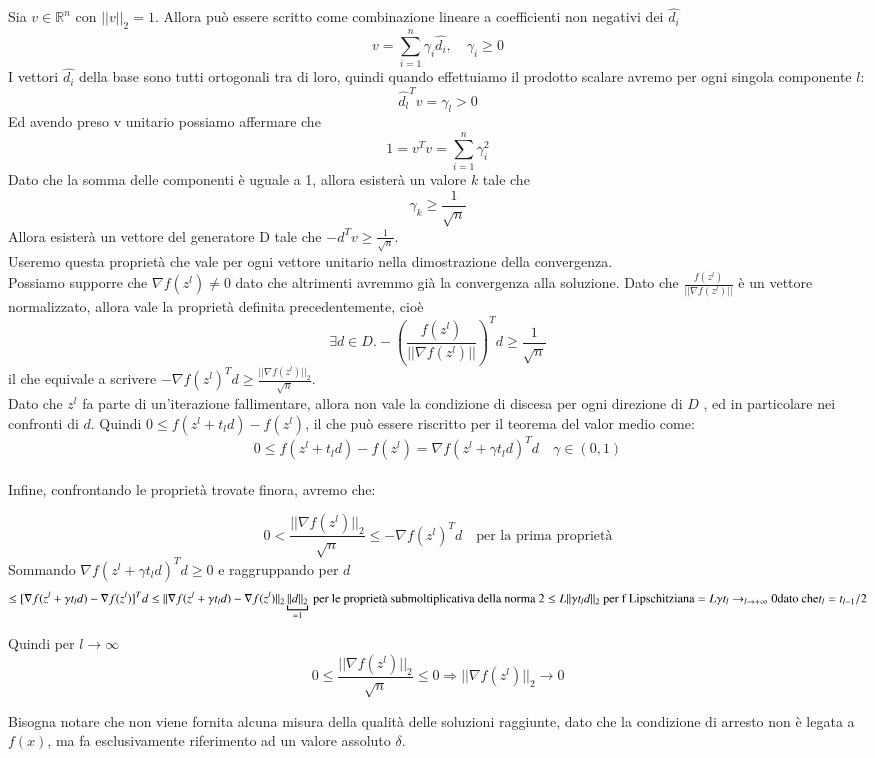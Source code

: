 \begin{thproof} Sia $v \in \mathbb{R}^{n}$ con $||v||_{2} = 1$.
Allora può essere scritto come combinazione lineare a coefficienti non
negativi dei $\hat{d_i}$
$$ v = \displaystyle \sum_{i=1}^{n} \gamma_i \hat{d_i}, 
\quad \gamma_i \geq 0 $$ I vettori $\hat{d_i}$ della base sono tutti
ortogonali tra di loro, quindi quando effettuiamo il prodotto scalare
avremo per ogni singola componente $l$:
$$ \hat{d_l}^{T} v = \gamma_l > 0 $$
Ed avendo preso v unitario possiamo affermare che
$$ 1 = v^{T} v   = \displaystyle \sum_{i=1}^{n} \gamma_{i}^2$$
Dato che la somma delle componenti \`e uguale a 1, allora esister\`a un
valore $k$ tale che
$$ {\gamma_k} \geq \frac{1}{\sqrt{n}}$$
Allora esister\`a un vettore del generatore D tale che $ -d^{T}v \geq
\frac{1}{\sqrt{n}} $. \\

Useremo questa propriet\`a che vale per ogni vettore unitario nella
dimostrazione della convergenza.\\ Possiamo supporre che $ \nabla
f(z^{l}) \neq 0$ dato che altrimenti avremmo gi\`a la convergenza alla
soluzione.  Dato che $\frac{f(z^{l})}{|| \nabla f(z^{l})||}$ \`e un
vettore normalizzato, allora vale la propriet\`a definita
precedentemente, cio\`e
$$\exists d \in D . - \left(\frac{f(z^{l})}{|| \nabla f(z^{l})||}\right)^{T} d \geq \frac{1}{\sqrt{n}}$$
il che equivale a scrivere $ -\nabla f(z^{l})^{T} d \geq \frac{||
\nabla f(z^{l})||_{2}}{\sqrt{n}} $.\\ Dato che $z^l$ fa parte di
un'iterazione fallimentare, allora non vale la condizione di discesa
per ogni direzione di $D$ , ed in particolare nei confronti di $d$.
Quindi $0 \leq f(z^l + t_l d) - f(z^l)$, il che può essere riscritto
per il teorema del valor medio come:
$$0 \leq f(z^{l} + t_l d) - f(z^{l}) =  \nabla f(z^{l} + \gamma t_l d)^{T} d \quad \gamma \in (0,1) $$
\\ Infine, confrontando le propriet\`a trovate finora, avremo che:

$$ 0 < 
\frac{|| \nabla f(z^{l})||_{2}}{\sqrt{n}} \leq -\nabla f(z^{l})^{T} d
\quad \text{per la prima propriet\`a}$$ Sommando $\nabla f(z^{l} +
\gamma t_l d )^T d \geq 0$ e raggruppando per $d$
$$\leq
 [ \nabla f(z^{l} + \gamma t_l d ) - \nabla f(z^{l})]^{T} d \leq ||
\nabla f(z^{l} + \gamma t_{l} d ) - \nabla f(z^{l}) ||_{2}
\underbracket{||d||_{2}}_{=1} \text{ per le propriet\`a
submoltiplicativa della norma 2} \\ \leq L || \gamma t_l d||_{2}
\text{ per f Lipschitziana} = L \gamma t_l \rightarrow_{l \to +
\infty} 0 \text{dato che} t_l=t_{l-1}/2$$

Quindi per $l \rightarrow \infty$
$$
0 \leq \frac{|| \nabla f(z^{l})||_{2}}{\sqrt{n}} \leq 0
\Longrightarrow || \nabla f(z^{l})||_{2} \rightarrow 0
$$
\end{thproof} Bisogna notare che non viene fornita alcuna misura della
qualit\`a delle soluzioni raggiunte, dato che la condizione di arresto
non \`e legata a $f(x)$, ma fa esclusivamente riferimento ad un valore
assoluto $\delta$.  
\outbpdocument


